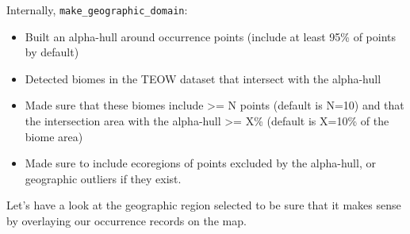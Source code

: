 \documentclass[
]{article}
\begin{document}
\begin{infobox}

Internally, \texttt{make\_geographic\_domain}:

\begin{itemize}
\item
  Built an alpha-hull around occurrence points (include at least 95\% of
  points by default)
\item
  Detected biomes in the TEOW dataset that intersect with the alpha-hull
\item
  Made sure that these biomes include \textgreater= N points (default is
  N=10) and that the intersection area with the alpha-hull \textgreater=
  X\% (default is X=10\% of the biome area)
\item
  Made sure to include ecoregions of points excluded by the alpha-hull,
  or geographic outliers if they exist.
\end{itemize}

\end{infobox}

Let's have a look at the geographic region selected to be sure that it
makes sense by overlaying our occurrence records on the map.
\end{document}
